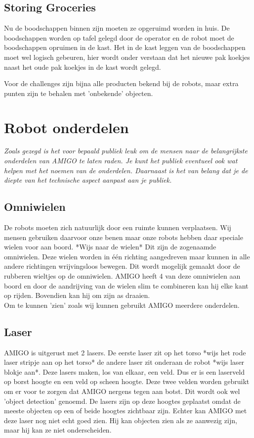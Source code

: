 \documentclass[a4paper,10pt]{article}
\numberwithin{equation}{section}
\numberwithin{figure}{section}
\numberwithin{table}{section}
\begin{document}
\subsection*{Storing Groceries}
Nu de boodschappen binnen zijn moeten ze opgeruimd worden in huis. De boodschappen worden op tafel gelegd door de operator en de robot moet de boodschappen opruimen in de kast. Het in de kast leggen van de boodschappen moet wel logisch gebeuren, hier wordt onder verstaan dat het nieuwe pak koekjes naast het oude pak koekjes in de kast wordt gelegd.\

Voor de challenges zijn bijna alle producten bekend bij de robots, maar extra punten zijn te behalen met 'onbekende' objecten.  

\section*{Robot onderdelen}
\textit{Zoals gezegd is het voor bepaald publiek leuk om de mensen naar de belangrijkste onderdelen van AMIGO te laten raden. Je kunt het publiek eventueel ook wat helpen met het noemen van de onderdelen. Daarnaast is het van belang dat je de diepte van het technische aspect aanpast aan je publiek.}\\

\subsection*{Omniwielen}
De robots moeten zich natuurlijk door een ruimte kunnen verplaatsen. Wij mensen gebruiken daarvoor onze benen maar onze robots hebben daar speciale wielen voor aan boord. *Wijs naar de wielen* Dit zijn de zogenaamde omniwielen. Deze wielen worden in één richting aangedreven maar kunnen in alle andere richtingen wrijvingsloos bewegen. Dit wordt mogelijk gemaakt door de rubberen wieltjes op de omniwielen. AMIGO heeft 4 van deze omniwielen aan boord en door de aandrijving van de wielen slim te combineren kan hij elke kant op rijden. Bovendien kan hij om zijn as draaien. \\


Om te kunnen 'zien' zoals wij kunnen gebruikt AMIGO meerdere onderdelen.
\subsection*{Laser}
AMIGO is uitgerust met 2 lasers. De eerste laser zit op het torso *wijs het rode laser stripje aan op het torso* de andere laser zit onderaan de robot *wijs laser blokje aan*. Deze lasers maken, los van elkaar, een veld. Dus er is een laserveld op borst hoogte en een veld op scheen hoogte. Deze twee velden worden gebruikt om er voor te zorgen dat AMIGO nergens tegen aan botst. Dit wordt ook wel 'object detection' genoemd. De lasers zijn op deze hoogtes geplaatst omdat de meeste objecten op een of beide hoogtes zichtbaar zijn. Echter kan AMIGO met deze laser nog niet echt goed zien. Hij kan objecten zien als ze aanwezig zijn, maar hij kan ze niet onderscheiden.
\end{document}
